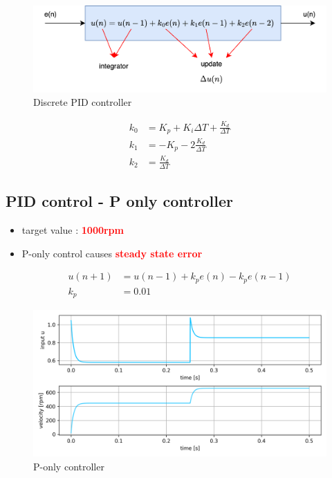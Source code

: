 \documentclass[12pt,twoside,onecolumn,openany,extrafontsizes,dvipsnames]{memoir}
\begin{document}
        \begin{figure}[!htb]
            \centering
            \includegraphics[scale=0.8]{../diagrams/control_generic/control_generic-pid_discrete.png}
            \caption{Discrete PID controller }
            \label{fig:discrete_pid_controller}
        \end{figure}

        
        \begin{align}
            k_0 &= K_p + K_i\Delta T + \frac{K_d}{\Delta T} \\
            k_1 &= -K_p - 2\frac{K_d}{\Delta T} \\
            k_2 &= \frac{K_d}{\Delta T}
        \end{align}

            \newpage
            \subsection{PID control - P only controller}

                \begin{itemize}
                    \item  target value : \textcolor{red}{\textbf { 1000rpm}}
                    \item  P-only control causes \textcolor{red}{\textbf {steady state error}}
                \end{itemize}
            
                \begin{align}
                    u(n+1) &= u(n-1) + k_pe(n) - k_pe(n-1) \\
                    k_p    &= 0.01
                \end{align}

                \begin{figure}[!htb]
                    \centering
                    \includegraphics[scale=0.8]{../images/motor_control/pid_p_control.png}
                    \caption{P-only controller}
                    \label{fig:p_controller}
                \end{figure}
\end{document}
